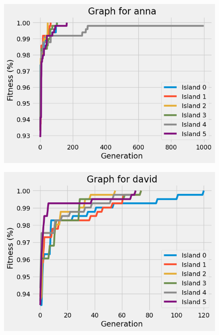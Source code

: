 \documentclass{article}
\begin{document}
\begin{multicols}{2}
\begin{figure}[H]
    \centering
    \includegraphics[scale=0.45]{imgs/convergence/anna_evolution.png}
\end{figure}
\begin{figure}[H]
    \centering
    \includegraphics[scale=0.45]{imgs/convergence/david_evolution.png}
\end{figure}
\begin{figure}[H]
    \centering

\end{figure}
\end{multicols}
\end{document}

